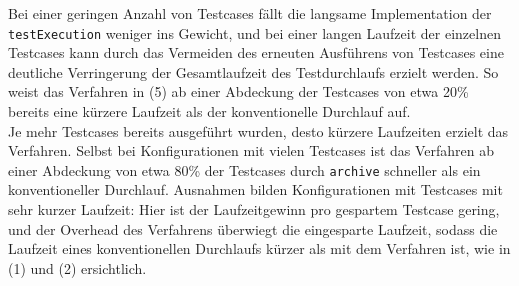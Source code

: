 Bei einer geringen Anzahl von Testcases fällt die langsame Implementation der \texttt{testExecution} weniger ins Gewicht, und bei einer langen Laufzeit der einzelnen Testcases kann durch das Vermeiden des erneuten Ausführens von Testcases eine deutliche Verringerung der Gesamtlaufzeit des Testdurchlaufs erzielt werden. So weist das Verfahren in (5) ab einer Abdeckung der Testcases von etwa 20\% bereits eine kürzere Laufzeit als der konventionelle Durchlauf auf.\\
Je mehr Testcases bereits ausgeführt wurden, desto kürzere Laufzeiten erzielt das Verfahren. Selbst bei Konfigurationen mit vielen Testcases ist das Verfahren ab einer Abdeckung von etwa 80\% der Testcases durch \texttt{archive} schneller als ein konventioneller Durchlauf. Ausnahmen bilden Konfigurationen mit Testcases mit sehr kurzer Laufzeit: Hier ist der Laufzeitgewinn pro gespartem Testcase gering, und der Overhead des Verfahrens überwiegt die eingesparte Laufzeit, sodass die Laufzeit eines konventionellen Durchlaufs kürzer als mit dem Verfahren ist, wie in (1) und (2) ersichtlich. 
